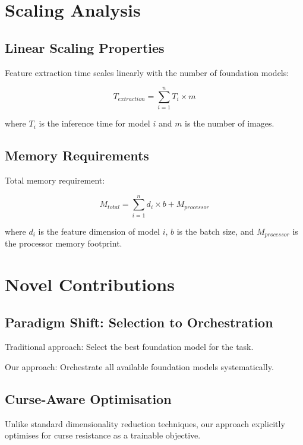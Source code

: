 \documentclass[11pt,a4paper]{article}
\begin{document}
\section{Scaling Analysis}

\subsection{Linear Scaling Properties}

Feature extraction time scales linearly with the number of foundation models:

\begin{equation}
T_{extraction} = \sum_{i=1}^{n} T_i \times m
\end{equation}

where $T_i$ is the inference time for model $i$ and $m$ is the number of images.

\subsection{Memory Requirements}

Total memory requirement:

\begin{equation}
M_{total} = \sum_{i=1}^{n} d_i \times b + M_{processor}
\end{equation}

where $d_i$ is the feature dimension of model $i$, $b$ is the batch size, and $M_{processor}$ is the processor memory footprint.

\section{Novel Contributions}

\subsection{Paradigm Shift: Selection to Orchestration}

Traditional approach: Select the best foundation model for the task.

Our approach: Orchestrate all available foundation models systematically.

\subsection{Curse-Aware Optimisation}

Unlike standard dimensionality reduction techniques, our approach explicitly optimises for curse resistance as a trainable objective.
\end{document}
